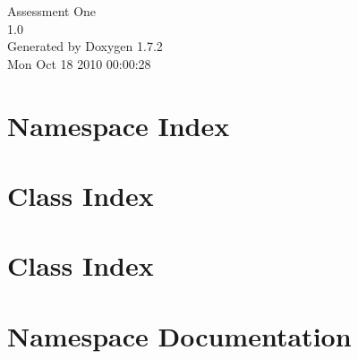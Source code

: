 \documentclass[a4paper]{book}
\begin{document}
\hypersetup{pageanchor=false}
\begin{titlepage}
\vspace*{7cm}
\begin{center}
{\Large Assessment One \\[1ex]\large 1.0 }\\
\vspace*{1cm}
{\large Generated by Doxygen 1.7.2}\\
\vspace*{0.5cm}
{\small Mon Oct 18 2010 00:00:28}\\
\end{center}
\end{titlepage}
\clearemptydoublepage
{}
\tableofcontents
\clearemptydoublepage
{}
\hypersetup{pageanchor=true}
\chapter{Namespace Index}

\chapter{Class Index}

\chapter{Class Index}

\chapter{Namespace Documentation}






\end{document}
